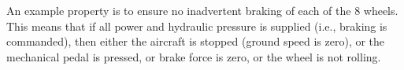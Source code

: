 An example property is to ensure no inadvertent braking of each of the 8 wheels.  This means that if all power and hydraulic pressure is supplied (i.e., braking is commanded), then either the aircraft is stopped (ground speed is zero), or the mechanical pedal is pressed, or brake force is zero, or the wheel is not rolling.













